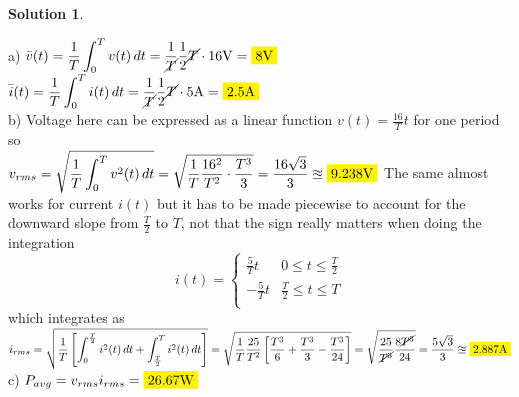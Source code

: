 \documentclass[10pt]{article}
\theoremstyle{definition}
\newtheorem{soln}{Solution}
\newcommand{\highlight}[1]{\colorbox{yellow}{$\displaystyle #1$}}
\newcommand{\volts}[0]{\mathrm{V}}
\newcommand{\amps}[0]{\mathrm{A}}
\newcommand{\watts}[0]{\mathrm{W}}
\begin{document}
\begin{soln}
\begin{center}
  \end{center}
  a) $\bar{v}(t)=\displaystyle{\frac{1}{T}\int_{0}^{T} v(t) \,dt=\frac{1}{\cancel{T}}\frac{1}{2}\cancel{T}\cdot16\volts}=\highlight{8\volts}$ \\
  $\bar{i}(t)=\displaystyle{\frac{1}{T}\int_{0}^{T} i(t) \,dt=\frac{1}{\cancel{T}}\frac{1}{2}\cancel{T}\cdot5\amps}=\highlight{2.5\amps}$ \\
  b) Voltage here can be expressed as a linear function $v(t)=\frac{16}{T}t$ for one period so \\
  $v_{rms}=\displaystyle{\sqrt{\frac{1}{T}\int_{0}^{T} v^2(t) \,dt}=\sqrt{\frac{1}{T}\frac{16^2}{T^2}\cdot\frac{T^3}{3}}=\frac{16\sqrt{3}}{3}}\approxeq\highlight{9.238\volts}$
  The same almost works for current $i(t)$ but it has to be made piecewise to account for the downward slope from $\displaystyle{\frac{T}{2}}$ to $T$, not that the sign really matters when doing the integration
  \[ i(t)=\begin{cases} 
      \frac{5}{T}t  & 0\leq t\leq \frac{T}{2} \\
      -\frac{5}{T}t & \frac{T}{2}\leq t\leq T \\
    \end{cases}
  \]
  which integrates as $i_{rms}=\displaystyle{\sqrt{\frac{1}{T}\left[\int_{0}^{\frac{T}{2}} i^2(t) \,dt+\int_{\frac{T}{2}}^{T} i^2(t) \,dt\right]}
    =\sqrt{\frac{1}{T}\frac{25}{T^2}\left[\frac{T^3}{6}+\frac{T^3}{3}-\frac{T^3}{24}\right]}
    =\sqrt{\frac{25}{\cancel{T^3}}\frac{8\cancel{T^3}}{24}}=\frac{5\sqrt{3}}{3}}\approxeq\highlight{2.887\amps}$\\
  c) $P_{avg}=v_{rms}i_{rms}=\highlight{26.67\watts}$
\end{soln}
\end{document}
